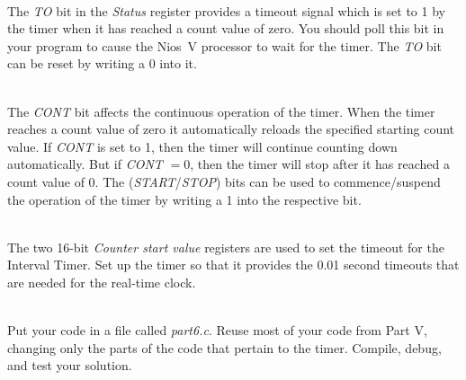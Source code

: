 \documentclass[epsfig,10pt,fullpage]{article}
\newcommand{\CommonDocsPath}{../../../../common/docs}
\begin{document}
~\\
The {\it TO} bit in the {\it Status} register provides a timeout signal which is set to 1 
by the timer when it has reached a count value of zero.  
You should poll this bit in your program to cause the Nios~V processor 
to wait for the timer.  The {\it TO} bit can be reset by writing a 0 into it.  

~\\
The {\it CONT} bit affects the continuous operation of the timer.  When the timer reaches
a count value of zero it automatically reloads the specified starting count value. If 
{\it CONT} is set to 1, then the timer will continue counting down automatically.
But if {\it CONT} $=0$, then the timer will stop after it has reached a count value of 0. 
The ({\it START}/{\it STOP}) bits can be used to commence/suspend the operation of the 
timer by writing a 1 into the respective bit.

~\\
The two 16-bit {\it Counter start value} registers are used to set the timeout for the
Interval Timer. Set up the timer so that it provides the 0.01 second timeouts that are
needed for the real-time clock. 

~\\
Put your code in a file called {\it part6.c}.
Reuse most of your code from Part V, changing only the parts of the code that pertain to
the timer.  Compile, debug, and test your solution.


\end{document}
